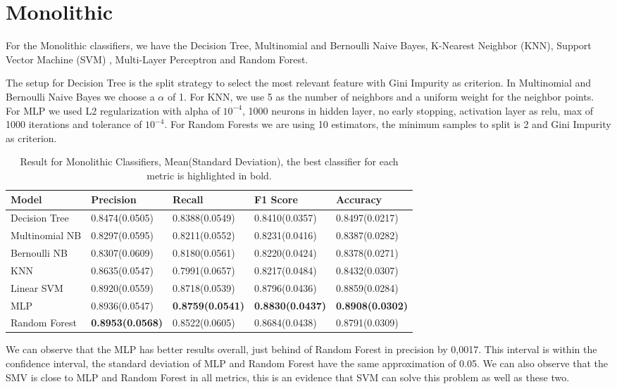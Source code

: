 \section{Monolithic}\label{mono}

For the Monolithic classifiers, we have the Decision Tree, Multinomial and Bernoulli Naive Bayes, K-Nearest Neighbor (KNN), Support Vector Machine (SVM) , Multi-Layer Perceptron  and Random Forest.

The setup for Decision Tree is the split strategy to select the most relevant feature with Gini Impurity as criterion. In Multinomial and Bernoulli Naive Bayes we choose a $\alpha$ of 1. For KNN, we use 5 as the number of neighbors and a uniform weight for the neighbor points. For MLP we used L2 regularization with alpha of $10^{-4}$, 1000 neurons in hidden layer, no early stopping, activation layer as relu, max of 1000 iterations and tolerance of $10^{-4}$. For Random Forests we are using 10 estimators, the minimum samples to split is 2 and Gini Impurity as criterion.

\begin{table}[h!]
    \centering
    \renewcommand{\arraystretch}{1.8}
    \begin{tabular}{ |p{3cm}|p{2.6cm}p{2.6cm}p{2.6cm}p{2.6cm}| }
        \hline
        Model & Precision & Recall & F1 Score & Accuracy \\
        \hline
        Decision Tree & 0.8474(0.0505) & 0.8388(0.0549) & 0.8410(0.0357) & 0.8497(0.0217) \\
        Multinomial NB & 0.8297(0.0595) & 0.8211(0.0552) & 0.8231(0.0416) & 0.8387(0.0282) \\
        Bernoulli NB & 0.8307(0.0609) & 0.8180(0.0561) & 0.8220(0.0424) & 0.8378(0.0271) \\
        KNN & 0.8635(0.0547) & 0.7991(0.0657) & 0.8217(0.0484) & 0.8432(0.0307) \\
        Linear SVM & 0.8920(0.0559) & 0.8718(0.0539) & 0.8796(0.0436) & 0.8859(0.0284) \\
        MLP & 0.8936(0.0547) & \textbf{0.8759(0.0541)} & \textbf{0.8830(0.0437)} & \textbf{0.8908(0.0302)} \\
        Random Forest & \textbf{0.8953(0.0568)} & 0.8522(0.0605) & 0.8684(0.0438) & 0.8791(0.0309) \\ [1ex]
        \hline
        \end{tabular}
        \caption{%
        Result for Monolithic Classifiers, Mean(Standard Deviation), the best classifier for each metric is highlighted in bold.%
        }\label{mcs_perceptron_table}
\end{table}

We can observe that the MLP has better results overall, just behind of Random Forest in precision by 0,0017. This interval is within the confidence interval, the standard deviation of MLP and Random Forest have the same approximation of 0.05. We can also observe that the SMV is close to MLP and Random Forest in all metrics, this is an evidence that SVM can solve this problem as well as these two.